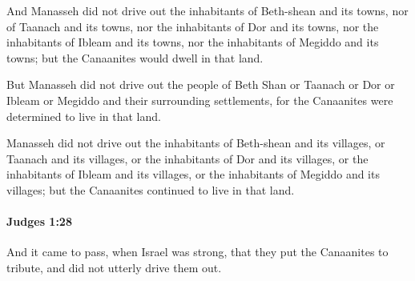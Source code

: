 			\begin{versebox}
					\item[BHS] 
					\item[ASV] And Manasseh did not drive out the inhabitants of Beth-shean and its towns, nor of Taanach and its towns, nor the inhabitants of Dor and its towns, nor the inhabitants of Ibleam and its towns, nor the inhabitants of Megiddo and its towns; but the Canaanites would dwell in that land.
					\item[NIV] But Manasseh did not drive out the people of Beth Shan or Taanach or Dor or Ibleam or Megiddo and their surrounding settlements, for the Canaanites were determined to live in that land.
					\item[NRSV] Manasseh did not drive out the inhabitants of Beth-shean and its villages, or Taanach and its villages, or the inhabitants of Dor and its villages, or the inhabitants of Ibleam and its villages, or the inhabitants of Megiddo and its villages; but the Canaanites continued to live in that land.
			\end{versebox}

		\paragraph{Judges 1:28} %
			\label{JUDGES-1-28}

			And it came to pass, when Israel was strong, that they put the Canaanites to tribute, and did not utterly drive them out.

